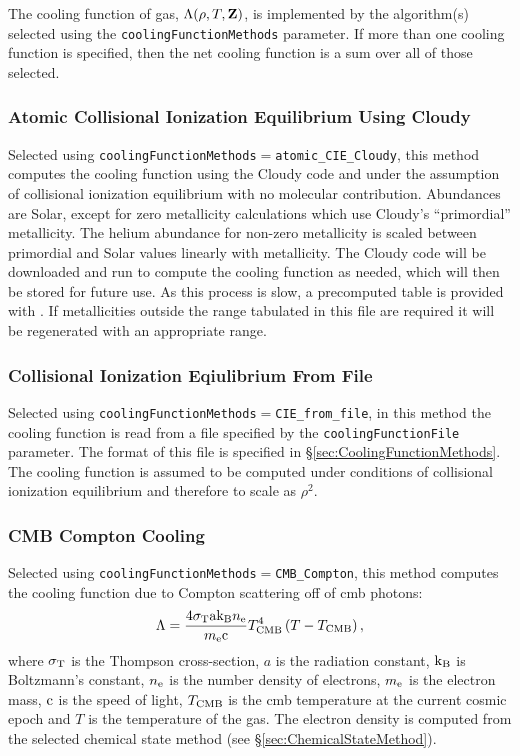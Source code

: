 The cooling function of gas, $\Lambda(\rho,T,{\bf Z})$, is implemented by the algorithm(s) selected using the {\tt coolingFunctionMethods} parameter. If more than one cooling function is specified, then the net cooling function is a sum over all of those selected.

\subsubsection{Atomic Collisional Ionization Equilibrium Using {\sc Cloudy}}

Selected using {\tt coolingFunctionMethods}$=${\tt atomic\_CIE\_Cloudy}, this method computes the cooling function using the {\sc Cloudy} code and under the assumption of collisional ionization equilibrium with no molecular contribution. Abundances are Solar, except for zero metallicity calculations which use {\sc Cloudy}'s ``primordial'' metallicity. The helium abundance for non-zero metallicity is scaled between primordial and Solar values linearly with metallicity. The {\sc Cloudy} code will be downloaded and run to compute the cooling function as needed, which will then be stored for future use. As this process is slow, a precomputed table is provided with \glc. If metallicities outside the range tabulated in this file are required it will be regenerated with an appropriate range.

\subsubsection{Collisional Ionization Eqiulibrium From File}

Selected using {\tt coolingFunctionMethods}$=${\tt CIE\_from\_file}, in this method the cooling function is read from a file specified by the {\tt coolingFunctionFile} parameter. The format of this file is specified in \S\ref{sec:CoolingFunctionMethods}. The cooling function is assumed to be computed under conditions of collisional ionization equilibrium and therefore to scale as $\rho^2$.

\subsubsection{CMB Compton Cooling}

Selected using {\tt coolingFunctionMethods}$=${\tt CMB\_Compton}, this method computes the cooling function due to Compton scattering off of \gls{cmb} photons:
\begin{equation}
\Lambda = {4 \sigma_{\rm T} {\rm a} {\rm k}_{\rm B} n_{\rm e } \over m_{\rm e} \clight} T_{\rm CMB}^4 \left( T - T_{\rm CMB} \right),
\end{equation}
where $\sigma_{\rm T}$ is the Thompson cross-section, $a$ is the radiation constant, ${\rm k}_{\rm B}$ is Boltzmann's constant, $n_{\rm e}$ is the number density of electrons, $m_{\rm e}$ is the electron mass, $\clight$ is the speed of light, $T_{\rm CMB}$ is the \gls{cmb} temperature at the current cosmic epoch and $T$ is the temperature of the gas. The electron density is computed from the selected chemical state method (see \S\ref{sec:ChemicalStateMethod}).

